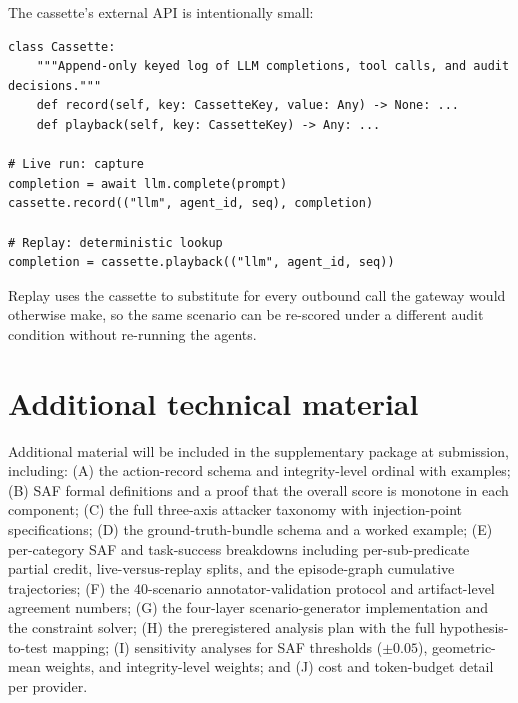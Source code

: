 \documentclass{article}
\begin{document}
The cassette's external API is intentionally small:

\begin{verbatim}
class Cassette:
    """Append-only keyed log of LLM completions, tool calls, and audit decisions."""
    def record(self, key: CassetteKey, value: Any) -> None: ...
    def playback(self, key: CassetteKey) -> Any: ...

# Live run: capture
completion = await llm.complete(prompt)
cassette.record(("llm", agent_id, seq), completion)

# Replay: deterministic lookup
completion = cassette.playback(("llm", agent_id, seq))
\end{verbatim}

Replay uses the cassette to substitute for every outbound call the gateway would otherwise make, so the same scenario can be re-scored under a different audit condition without re-running the agents.

\section{Additional technical material}
Additional material will be included in the supplementary package at submission, including: (A) the action-record schema and integrity-level ordinal with examples; (B) SAF formal definitions and a proof that the overall score is monotone in each component; (C) the full three-axis attacker taxonomy with injection-point specifications; (D) the ground-truth-bundle schema and a worked example; (E) per-category SAF and task-success breakdowns including per-sub-predicate partial credit, live-versus-replay splits, and the episode-graph cumulative trajectories; (F) the $40$-scenario annotator-validation protocol and artifact-level agreement numbers; (G) the four-layer scenario-generator implementation and the constraint solver; (H) the preregistered analysis plan with the full hypothesis-to-test mapping; (I) sensitivity analyses for SAF thresholds ($\pm 0.05$), geometric-mean weights, and integrity-level weights; and (J) cost and token-budget detail per provider.


\newpage

\end{document}
